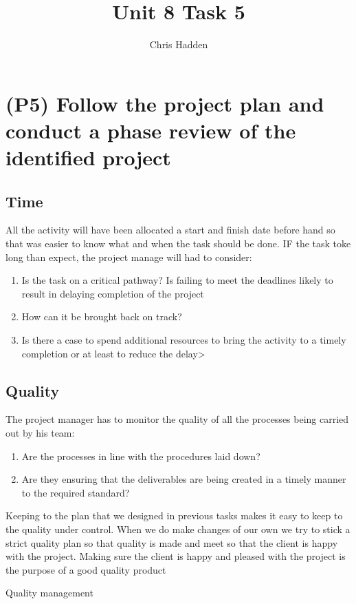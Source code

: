 \documentclass{article}
\begin{document}
\title{Unit 8 Task 5}
\author{Chris Hadden}
\date{}
\maketitle

\section{(P5) Follow the project plan and conduct a phase review of the identified project}
\subsection{Time}
All the activity will have been allocated a start and finish date before hand so that was easier to know what and when the task should be done. IF the task toke long than expect, the project manage will had to consider:
\begin{enumerate}
	\item Is the task on a critical pathway? Is failing to meet the deadlines likely to result in delaying completion of the project
	\item How can it be brought back on track?
	\item Is there a case to spend additional resources to bring the activity to a timely completion or at least to reduce the delay>
\end{enumerate}

\subsection{Quality}
 The project manager has to monitor the quality of all the processes being carried out by his team:
 \begin{enumerate}
 	\item Are the processes in line with the procedures laid down?
	\item Are they ensuring that the deliverables are being created in a timely manner to the required standard?
\end{enumerate}

Keeping to the plan that we designed in previous tasks makes it easy to keep to the quality under control. When we do make changes of our own we try to stick a strict quality plan so that quality is made and meet so that the client is happy with the project. Making sure the client is happy and pleased with the project is the purpose of a good quality product 

Quality management
\end{document}
